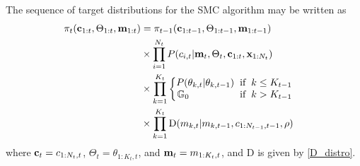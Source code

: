 \documentclass{article}
\begin{document}
The sequence of target distributions for the SMC algorithm may be written as
\begin{equation}
\begin{split}
\pi_{t}(\bold{c}_{1:t}, \Theta_{1:t}, \bold{m}_{1:t}) & =  \pi_{t-1}(\bold{c}_{1:t-1}, \Theta_{1:t-1}, \bold{m}_{1:t-1})\\
& \times \prod_{i=1}^{N_{t}} P(c_{i,t} | \bold{m}_{t}, \Theta_{t}, \bold{c}_{1:t}, \bold{x}_{1:N_{t}}) \\
& \times \prod_{k=1}^{K_{t}} 
\begin{cases}
\begin{split}
P(\theta_{k,t} | \theta_{k,t-1}) \hspace{2mm} & \text{if} \hspace{2mm} k \leq K_{t-1} \\
\mathbb{G}_{0} \hspace{18mm} & \text{if} \hspace{2mm} k > K_{t-1}
\end{split}
\end{cases} \\
& \times \prod_{k=1}^{K_{t}} \text{D}(m_{k,t} | m_{k,t-1}, c_{1:N_{t-1}, t-1}, \rho)
\end{split}
\end{equation}
where $\bold{c}_{t} = c_{1:N_{t},t}$, $\Theta_{t} = \theta_{1:K_{t},t}$, and $\bold{m}_{t} = m_{1:K_{t},t} $, and D is given by \eqref{D_distro}.
\end{document}
